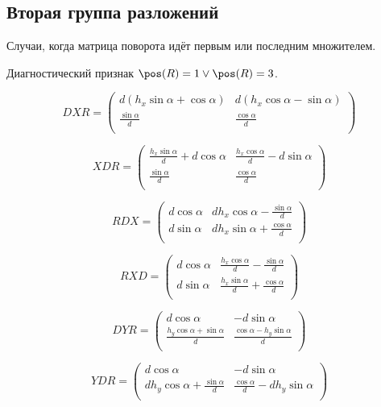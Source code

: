 \subsection{Вторая группа разложений}

Случаи, когда матрица поворота идёт первым или последним множителем.

Диагностический признак $\pos(R)=1 \vee \pos(R)=3 $.

$$DXR =
 \begin{pmatrix} d \left(
 h_x \sin\alpha + \cos\alpha \right) & d \left( h_x \cos\alpha - \sin\alpha
 \right) \\
\displaystyle\frac{\sin\alpha}{d} & \displaystyle\frac{\cos\alpha}{d} \\
 \end{pmatrix} $$

$$XDR =
 \begin{pmatrix} \displaystyle\frac{h_x \sin\alpha}{d} + d \cos\alpha & \displaystyle\frac{h_x \cos\alpha}{d} - d \sin\alpha \\
\displaystyle\frac{\sin\alpha}{d} & \displaystyle\frac{\cos\alpha}{d} \\
 \end{pmatrix} $$
 
$$RDX =
 \begin{pmatrix} d \cos\alpha &
 d h_x \cos\alpha - \displaystyle\frac{\sin\alpha}{d} \\
d \sin\alpha & d h_x \sin\alpha + \displaystyle\frac{\cos\alpha}{d} \\
 \end{pmatrix} $$
 
$$RXD =
 \begin{pmatrix} d \cos\alpha &
 \displaystyle\frac{h_x \cos\alpha}{d} - \displaystyle\frac{\sin\alpha}{d} \\
d \sin\alpha & \displaystyle\frac{
 h_x \sin\alpha}{d} + \displaystyle\frac{\cos\alpha}{d} \\
 \end{pmatrix} $$

$$DYR =
 \begin{pmatrix} d \cos\alpha &
 - d \sin\alpha \\
\displaystyle\frac{h_y \cos\alpha + \sin\alpha}{d} & \displaystyle\frac{\cos\alpha - h_y \sin\alpha}{d} \\
 \end{pmatrix} $$
 
$$YDR =
 \begin{pmatrix} d \cos\alpha &
 - d \sin\alpha \\
d h_y \cos\alpha + \displaystyle\frac{\sin\alpha}{d} & \displaystyle\frac{\cos\alpha
 }{d} - d h_y \sin\alpha \\
 \end{pmatrix} $$

